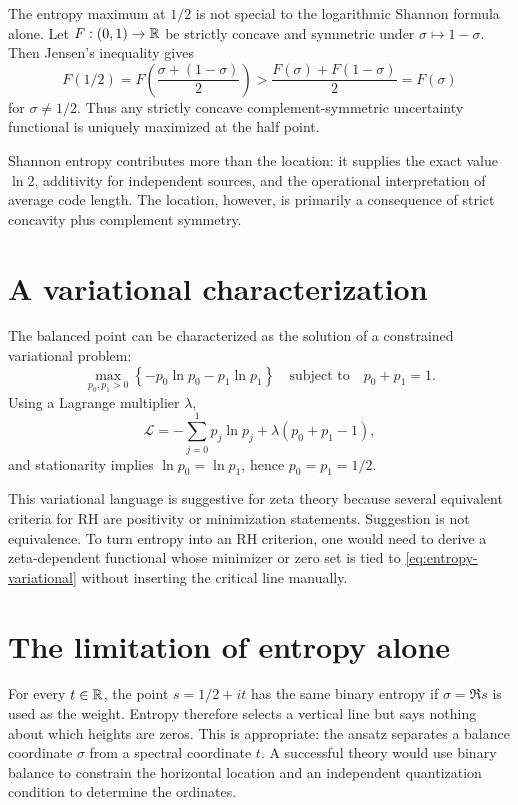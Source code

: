 The entropy maximum at $1/2$ is not special to the logarithmic Shannon formula alone. Let $F:(0,1)\to\mathbb{R}$ be strictly concave and symmetric under $\sigma\mapsto1-\sigma$. Then Jensen's inequality gives
\[
 F(1/2)=F\!\left(\frac{\sigma+(1-\sigma)}{2}\right)
 >\frac{F(\sigma)+F(1-\sigma)}{2}=F(\sigma)
\]
for $\sigma\neq1/2$. Thus any strictly concave complement-symmetric uncertainty functional is uniquely maximized at the half point.

Shannon entropy contributes more than the location: it supplies the exact value $\ln2$, additivity for independent sources, and the operational interpretation of average code length. The location, however, is primarily a consequence of strict concavity plus complement symmetry.

\section{A variational characterization}

The balanced point can be characterized as the solution of a constrained variational problem:
\begin{equation}
 \max_{p_0,p_1>0}\left\{-p_0\ln p_0-p_1\ln p_1\right\}
 \quad\text{subject to}\quad p_0+p_1=1.
 \label{eq:entropy-variational}
\end{equation}
Using a Lagrange multiplier $\lambda$,
\[
 \mathcal{L}=-\sum_{j=0}^{1}p_j\ln p_j+\lambda(p_0+p_1-1),
\]
and stationarity implies $\ln p_0=\ln p_1$, hence $p_0=p_1=1/2$.

This variational language is suggestive for zeta theory because several equivalent criteria for RH are positivity or minimization statements. Suggestion is not equivalence. To turn entropy into an RH criterion, one would need to derive a zeta-dependent functional whose minimizer or zero set is tied to \cref{eq:entropy-variational} without inserting the critical line manually.

\section{The limitation of entropy alone}

For every $t\in\mathbb{R}$, the point $s=1/2+it$ has the same binary entropy if $\sigma=\Re s$ is used as the weight. Entropy therefore selects a vertical line but says nothing about which heights are zeros. This is appropriate: the ansatz separates a balance coordinate $\sigma$ from a spectral coordinate $t$. A successful theory would use binary balance to constrain the horizontal location and an independent quantization condition to determine the ordinates.

